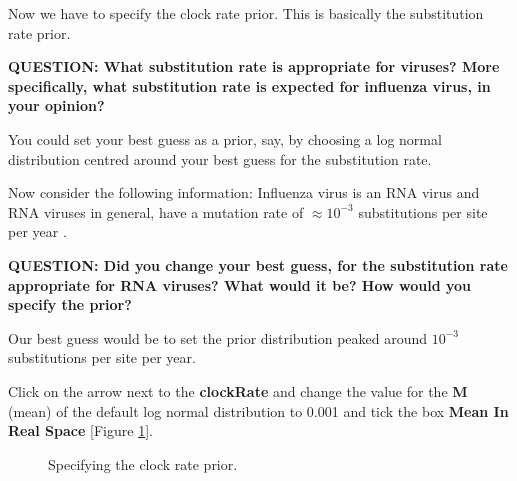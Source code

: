 \documentclass[11pt]{article}
\begin{document}
Now we have to specify the clock rate prior. This is basically the substitution rate prior.

\begin{framed}
{\bf QUESTION: What substitution rate is appropriate for viruses? More specifically, what substitution rate is expected for influenza virus, in your opinion?} 
\end{framed}

You could set your best guess as a prior, say, by choosing a log normal distribution centred around your best guess for the substitution rate. 

Now consider the following information: Influenza virus is an RNA virus \citep{kawaoka2006} and RNA viruses in general, have a mutation rate of $\approx 10^{-3}$ substitutions per site per year \citep{jenkins2002}. 

\begin{framed}
{\bf QUESTION: Did you change your best guess, for the substitution rate appropriate for RNA viruses? What would it be? How would you specify the prior?} 
\end{framed}

Our best guess would be to set the prior distribution peaked around $10^{-3}$ substitutions per site per year.

\begin{framed}
Click on the arrow next to the \textbf{clockRate} and change the value for the \textbf{M} (mean) of the default log normal distribution to 0.001 and tick the box \textbf{Mean In Real Space} [Figure \ref{clockRatePrior}].
\end{framed}

\begin{figure}[h!]
\centering
{}
\caption{\small Specifying the clock rate prior.}
\label{clockRatePrior}
\end{figure}
\end{document}
